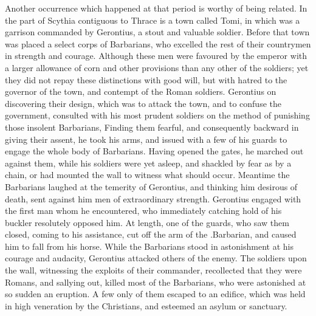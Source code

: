 Another occurrence which happened at that period is worthy of being related. In the part of Scythia contiguous to Thrace is a town called Tomi, in which was a garrison commanded by Gerontius, a stout and valuable soldier. Before that town was placed a select corps of Barbarians, who excelled the rest of their countrymen in strength and courage. Although these men were favoured by the emperor with a larger allowance of corn and other provisions than any other of the soldiers; yet they did not repay these distinctions with good will, but with hatred to the governor of the town, and contempt of the Roman soldiers. Gerontius on discovering their design, which was to attack the town, and to confuse the government, consulted with his most prudent soldiers on the method of punishing those insolent Barbarians, Finding them fearful, and consequently backward in giving their assent, he took his arms, and issued with a few of his guards to engage the whole body of Barbarians. Having opened the gates, he marched out against them, while his soldiers were yet asleep, and shackled by fear as by a chain, or had mounted the wall to witness what should occur. Meantime the Barbarians laughed at the temerity of Gerontius, and thinking him desirous of death, sent against him men of extraordinary strength. Gerontius engaged with the first man whom he encountered, who immediately catching hold of his buckler resolutely opposed him. At length, one of the guards, who saw them closed, coming to his assistance, cut off the arm of the .Barbarian, and caused him to fall from his horse. While the Barbarians stood in astonishment at his courage and audacity, Gerontius attacked others of the enemy. The soldiers upon the wall, witnessing the exploits of their commander, recollected that they were Romans, and sallying out, killed most of the Barbarians, who were astonished at so sudden an eruption. A few only of them escaped to an edifice, which was held in high veneration by the Christians, and esteemed an asylum or sanctuary.

